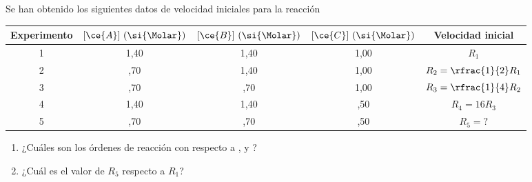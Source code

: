 Se han obtenido los siguientes datos de velocidad iniciales para la reacción 
\begin{center}
	\begin{tabular}{SSSSc}
		\toprule
		{Experimento}	& {$[\ce{A}]~(\si{\Molar})$}	& {$[\ce{B}]~(\si{\Molar})$}	& {$[\ce{C}]~(\si{\Molar})$}	& {Velocidad inicial}		\\
				 	 	& 		1,40			   		&		1,40					& 			1,00				& 		$R_1$      			\\
		2 		  		& 		 ,70			   		& 		1,40					& 			1,00				& $R_2=\rfrac{1}{2} R_1$	\\
		3		  		&			 ,70				&		 ,70					& 			1,00				& $R_3=\rfrac{1}{4} R_2$	\\
		4		  		&			1,40				& 		1,40					& 			 ,50				& $R_4 = 16 R_3$		 	\\
		5		  		& 		 ,70			  		&		 ,70					& 			 ,50				& $R_5=?$				 	\\
		\bottomrule
	\end{tabular}
\end{center}
\begin{enumerate}[label={\alph*)},font={\color{red!50!black}\bfseries}]
	\item ¿Cuáles son los órdenes de reacción con respecto a ,  y ?
	\item ¿Cuál es el valor de $R_5$ respecto a $R_1$?
\end{enumerate}
